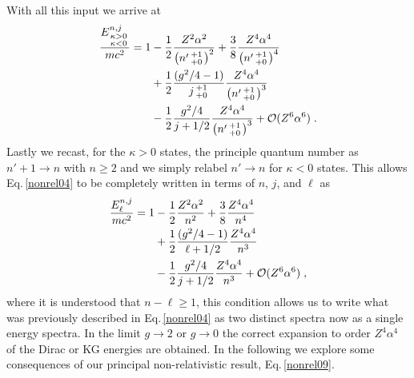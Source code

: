 With all this input we arrive at
\begin{alignat}{1}
\label{nonrel04} \frac{E^{n,j}_{\begin{smallmatrix}
\kappa>0 \\ \kappa<0
\end{smallmatrix}}}{mc^{2}}=1&-\frac{1}{2}\frac{Z^{2}\alpha^{2}}{\left(n'\begin{smallmatrix}
+1 \\ +0
\end{smallmatrix}\right)^{2}}+\frac{3}{8}\frac{Z^{4}\alpha^{4}}{\left(n'\begin{smallmatrix}
+1 \\ +0
\end{smallmatrix}\right)^{4}}
\\ \notag &+\frac{1}{2}
\frac{(g^{2}/4-1)}{j\begin{smallmatrix}
+1 \\ +0
\end{smallmatrix}}\frac{Z^{4}\alpha^{4}}{\left(n'\begin{smallmatrix}
+1 \\ +0
\end{smallmatrix}\right)^{3}}\\
\notag &-\frac{1}{2}\frac{g^{2}/4}{j+1/2}\frac{Z^{4}\alpha^{4}}{\left(n'\begin{smallmatrix}
+1 \\ +0
\end{smallmatrix}\right)^{3}}+\mathcal{O}(Z^{6}\alpha^{6})\;.
\end{alignat}
Lastly we recast, for the $\kappa>0$ states, the principle quantum number as $n'+1\rightarrow n$ with $n\geq2$ and we simply relabel $n'\rightarrow n$ for $\kappa<0$ states. This allows Eq.\,\eqref{nonrel04} to be completely written in terms of $n$, $j$, and $\ell$ as
\begin{alignat}{1}
\label{nonrel09} \frac{E^{n,j}_{\ell}}{mc^{2}}=1&-\frac{1}{2}\frac{Z^{2}\alpha^{2}}{n^{2}}+\frac{3}{8}\frac{Z^{4}\alpha^{4}}{n^{4}}\\
\notag &+\frac{1}{2}\frac{(g^{2}/4-1)}{\ell+1/2}\frac{Z^{4}\alpha^{4}}{n^{3}}\\
\notag &-\frac{1}{2}\frac{g^{2}/4}{j+1/2}\frac{Z^{4}\alpha^{4}}{n^{3}}+\mathcal{O}(Z^{6}\alpha^{6})\;,\end{alignat}
where it is understood that $n-\ell\geq1$, this condition allows us to write what was previously described in Eq.\,\eqref{nonrel04} as two distinct spectra now as a single energy spectra. In the limit $g\rightarrow2$ or $g\rightarrow0$ the correct expansion to order $Z^{4}\alpha^4$ of the Dirac or KG energies are obtained. In the following we explore some consequences of our principal non-relativistic result, Eq.\,\eqref{nonrel09}.

